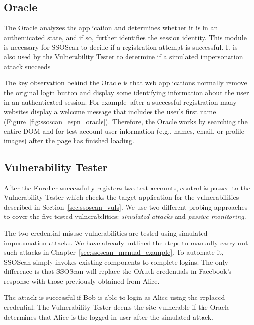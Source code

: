\subsection{Oracle}
\label{sec:ssoscan_design_oracle}

The Oracle analyzes the application and determines whether it is in an authenticated state, and if so, further identifies the session identity.  This module is necessary for SSOScan to decide if a registration attempt is successful.  It is also used by the Vulnerability Tester to determine if a simulated impersonation attack succeeds.

The key observation behind the Oracle is that web applications normally remove the original login button and display some identifying information about the user in an authenticated session.  For example, after a successful registration many websites display a welcome message that includes the user's first name (Figure~\ref{fig:ssoscan_espn_oracle}).  Therefore, the Oracle works by searching the entire DOM and  for test account user information (e.g., names, email, or profile images) after the page has finished loading.

\subsection{Vulnerability Tester}
\label{sec:ssoscan_design_vt}

After the Enroller successfully registers two test accounts, control is passed to the Vulnerability Tester which checks the target application for the vulnerabilities described in Section~\ref{sec:ssoscan_vuls}.  We use two different probing approaches to cover the five tested vulnerabilities: \emph{simulated attacks} and \emph{passive monitoring}.

 The two credential misuse vulnerabilities are tested using simulated impersonation attacks.  We have already outlined the steps to manually carry out such attacks in Chapter~\ref{sec:ssoscan_manual_example}.  To automate it, SSOScan simply invokes existing components to complete logins.  The only difference is that SSOScan will replace the OAuth credentials in Facebook's response with those previously obtained from Alice.

The attack is successful if Bob is able to login as Alice using the replaced credential.  The Vulnerability Tester deems the site vulnerable if the Oracle determines that Alice is the logged in user after the simulated attack.

